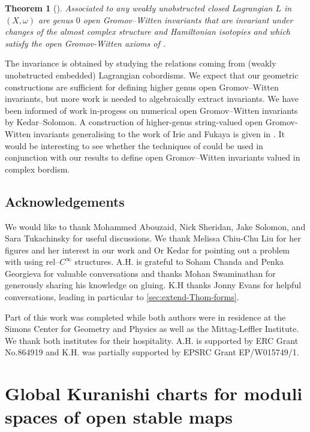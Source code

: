 \documentclass[11pt,psamsfonts, oneside, reqno]{amsart}
\newtheorem{intthm}{Theorem}
\theoremstyle{definition}
\theoremstyle{remark}
\numberwithin{equation}{section}
\begin{document}
\begin{intthm}[{\cite{HH2}}]
	Associated to any weakly unobstructed closed Lagrangian $L$ in $(X,\omega)$ are genus $0$ open Gromov--Witten invariants that are invariant under changes of the almost complex structure and Hamiltonian isotopies and which satisfy the open Gromov-Witten axioms of \cite[Theorem~4]{ST1}.
\end{intthm}

\noindent
The invariance is obtained by studying the relations coming from (weakly unobstructed embedded) Lagrangian cobordisms. We expect that our geometric constructions are sufficient for defining higher genus open Gromov--Witten invariants, but more work is needed to algebraically extract invariants. We have been informed of work in-progess on numerical open Gromov--Witten invariants by Kedar--Solomon. A construction of higher-genus string-valued open Gromov-Witten invariants generalising to the work of Irie and Fukaya is given in \cite{DH}. It would be interesting to see whether the techniques of \cite{AB24b} could be used in conjunction with our results to define open Gromov--Witten invariants valued in complex bordism.


\subsection*{Acknowledgements} We would like to thank Mohammed Abouzaid, Nick Sheridan, Jake Solomon, and Sara Tukachinsky for useful discussions. We thank Melissa Chiu-Chu Liu for her figures and her interest in our work and Or Kedar for pointing out a problem with using rel--$C^\infty$ structures. A.H. is grateful to Soham Chanda and Penka Georgieva for valuable conversations and thanks Mohan Swaminathan for generously sharing his knowledge on gluing. K.H thanks Jonny Evans for helpful conversations, leading in particular to \textsection \ref{sec:extend-Thom-forms}.

Part of this work was completed while both authors were in residence at the Simons Center for Geometry and Physics as well as the Mittag-Leffler Institute. We thank both institutes for their hospitality. A.H. is supported by ERC Grant No.864919 and K.H. was partially supported by EPSRC Grant EP/W015749/1.

\section{Global Kuranishi charts for moduli spaces of open stable maps}\label{sec:construction}
\end{document}
